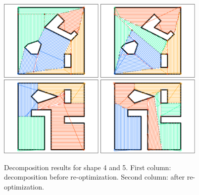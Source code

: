 \documentclass[../main.tex]{subfiles}
\begin{document}
\begin{figure}
	\centering
	\includegraphics[width=0.45\textwidth]{img/chapter_5/ID_4_orig.pdf}%
	\includegraphics[width=0.45\textwidth]{img/chapter_5/ID_4_reopt.pdf}
	\includegraphics[width=0.45\textwidth]{img/chapter_5/ID_5_orig.pdf}%
	\includegraphics[width=0.45\textwidth]{img/chapter_5/ID_5_reopt.pdf}
	\caption{Decomposition results for shape 4 and 5. First column: decomposition before re-optimization. Second column: after re-optimization.}
	\label{fig:decomposition_results_ii}
\end{figure}
\end{document}
